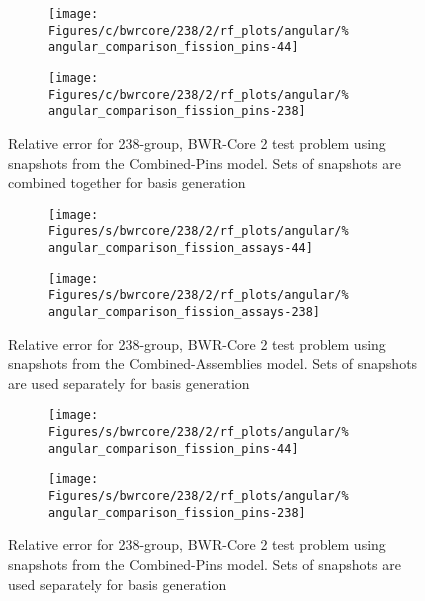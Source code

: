 \begin{figure*}[tb]
    \centering
    \begin{subfigure}{0.5\textwidth}
        \centering
        \texttt{[image: Figures/c/bwrcore/238/2/rf\_plots/angular/\%
            angular\_comparison\_fission\_pins-44]}
    \end{subfigure}%
    \begin{subfigure}{0.5\textwidth}
        \centering
        \texttt{[image: Figures/c/bwrcore/238/2/rf\_plots/angular/\%
            angular\_comparison\_fission\_pins-238]}
    \end{subfigure}
    \caption{Relative error for 238-group, BWR-Core 2 test problem using 
        snapshots from the Combined-Pins model.  Sets of snapshots are 
        combined together for basis generation}
    \label{fig:BWR2-pins-combined-238}
\end{figure*}

\begin{figure*}[tb]
    \centering
    \begin{subfigure}{0.5\textwidth}
        \centering
        \texttt{[image: Figures/s/bwrcore/238/2/rf\_plots/angular/\%
            angular\_comparison\_fission\_assays-44]}
    \end{subfigure}%
    \begin{subfigure}{0.5\textwidth}
        \centering
        \texttt{[image: Figures/s/bwrcore/238/2/rf\_plots/angular/\%
            angular\_comparison\_fission\_assays-238]}
    \end{subfigure}
    \caption{Relative error for 238-group, BWR-Core 2 test problem using 
        snapshots from the Combined-Assemblies model.  Sets of snapshots are 
        used separately for basis generation}
    \label{fig:BWR2-assay-single-238}
\end{figure*}

\begin{figure*}[tb]
    \centering
    \begin{subfigure}{0.5\textwidth}
        \centering
        \texttt{[image: Figures/s/bwrcore/238/2/rf\_plots/angular/\%
            angular\_comparison\_fission\_pins-44]}
    \end{subfigure}%
    \begin{subfigure}{0.5\textwidth}
        \centering
        \texttt{[image: Figures/s/bwrcore/238/2/rf\_plots/angular/\%
            angular\_comparison\_fission\_pins-238]}
    \end{subfigure}
    \caption{Relative error for 238-group, BWR-Core 2 test problem using 
        snapshots from the Combined-Pins model.  Sets of snapshots are 
        used separately for basis generation}
    \label{fig:BWR2-pins-single-238}
\end{figure*}
